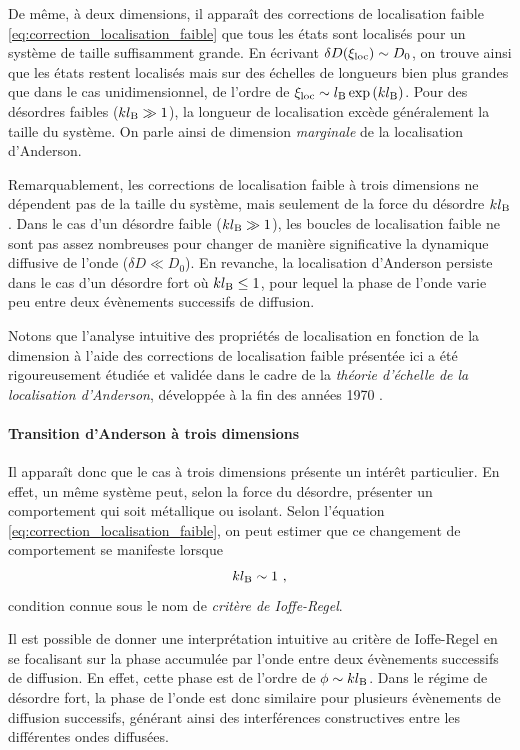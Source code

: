 De même, à deux dimensions, il apparaît des corrections de localisation faible \ref{eq:correction_localisation_faible} que tous les états sont localisés pour un système de taille suffisamment grande. En écrivant $\delta D(\xi_{\mathrm{loc}})\sim D_{\mathrm{0}}$, on trouve ainsi que les états restent localisés mais sur des échelles de longueurs bien plus grandes que dans le cas unidimensionnel, de l'ordre de $\xi_{\mathrm{loc}} \sim l_{\mathrm{B}} \exp{(k l_{\mathrm{B}})}$. Pour des désordres faibles ($k l_{\mathrm{B}} \gg 1$), la longueur de localisation excède généralement la taille du système. On parle ainsi de dimension \emph{marginale} de la localisation d'Anderson.

Remarquablement, les corrections de localisation faible à trois dimensions ne dépendent pas de la taille du système, mais seulement de la force du désordre $k l_{\mathrm{B}}$. Dans le cas d'un désordre faible ($kl_{\mathrm{B}}\gg 1$), les boucles de localisation faible ne sont pas assez nombreuses pour changer de manière significative la dynamique diffusive de l'onde ($\delta D \ll D_{\mathrm{0}}$). En revanche, la localisation d'Anderson persiste dans le cas d'un désordre fort où $k l_{\mathrm{B}} \leq 1$, pour lequel la phase de l'onde varie peu entre deux évènements successifs de diffusion. 

Notons que l'analyse intuitive des propriétés de localisation en fonction de la dimension à l'aide des corrections de localisation faible présentée ici a été rigoureusement étudiée et validée dans le cadre de la \emph{théorie d'échelle de la localisation d'Anderson}, développée à la fin des années 1970 \citep{abrahams1979scaling}.

\paragraph*{Transition d'Anderson à trois dimensions}
Il apparaît donc que le cas à trois dimensions présente un intérêt particulier. En effet, un même système peut, selon la force du désordre, présenter un comportement qui soit métallique ou isolant. Selon l'équation \ref{eq:correction_localisation_faible}, on peut estimer que ce changement de comportement se manifeste lorsque
\begin{equation}
k l_{\mathrm{B}} \sim 1 \text{ ,}
\label{eq:ioffe_regel}
\end{equation}
condition connue sous le nom de \emph{critère de Ioffe-Regel}. 

Il est possible de donner une interprétation intuitive au critère de Ioffe-Regel en se focalisant sur la phase accumulée par l'onde entre deux évènements successifs de diffusion. En effet, cette phase est de l'ordre de $\phi\sim kl_{\mathrm{B}}$. Dans le régime de désordre fort, la phase de l'onde est donc similaire pour plusieurs évènements de diffusion successifs, générant ainsi des interférences constructives entre les différentes ondes diffusées. 

